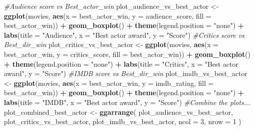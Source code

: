\documentclass[]{article}
\newenvironment{Shaded}{\begin{snugshade}}{\end{snugshade}}
\newcommand{\CommentTok}[1]{\textcolor[rgb]{0.56,0.35,0.01}{\textit{#1}}}
\newcommand{\DataTypeTok}[1]{\textcolor[rgb]{0.13,0.29,0.53}{#1}}
\newcommand{\DecValTok}[1]{\textcolor[rgb]{0.00,0.00,0.81}{#1}}
\newcommand{\KeywordTok}[1]{\textcolor[rgb]{0.13,0.29,0.53}{\textbf{#1}}}
\newcommand{\NormalTok}[1]{#1}
\newcommand{\OperatorTok}[1]{\textcolor[rgb]{0.81,0.36,0.00}{\textbf{#1}}}
\newcommand{\StringTok}[1]{\textcolor[rgb]{0.31,0.60,0.02}{#1}}
\begin{document}
\begin{Shaded}
\begin{Highlighting}[]
\CommentTok{#Audience score vs Best_actor_win}
\NormalTok{plot_audience_vs_best_actor <-}
\StringTok{  }\KeywordTok{ggplot}\NormalTok{(movies,}
         \KeywordTok{aes}\NormalTok{(}\DataTypeTok{x =}\NormalTok{ best_actor_win, }\DataTypeTok{y =}\NormalTok{ audience_score, }\DataTypeTok{fill =}\NormalTok{ best_actor_win)) }\OperatorTok{+}
\StringTok{  }\KeywordTok{geom_boxplot}\NormalTok{() }\OperatorTok{+}\StringTok{ }\KeywordTok{theme}\NormalTok{(}\DataTypeTok{legend.position =} \StringTok{"none"}\NormalTok{) }\OperatorTok{+}\StringTok{ }\KeywordTok{labs}\NormalTok{(}\DataTypeTok{title =} \StringTok{"Audience"}\NormalTok{, }\DataTypeTok{x =} \StringTok{"Best actor award"}\NormalTok{, }\DataTypeTok{y =} \StringTok{"Score"}\NormalTok{)}
\CommentTok{#Critics score vs Best_dir_win}
\NormalTok{plot_critics_vs_best_actor <-}
\StringTok{  }\KeywordTok{ggplot}\NormalTok{(movies,}
         \KeywordTok{aes}\NormalTok{(}\DataTypeTok{x =}\NormalTok{ best_actor_win, }\DataTypeTok{y =}\NormalTok{ critics_score, }\DataTypeTok{fill =}\NormalTok{ best_actor_win)) }\OperatorTok{+}\StringTok{ }\KeywordTok{geom_boxplot}\NormalTok{() }\OperatorTok{+}\StringTok{ }\KeywordTok{theme}\NormalTok{(}\DataTypeTok{legend.position =} \StringTok{"none"}\NormalTok{) }\OperatorTok{+}\StringTok{ }\KeywordTok{labs}\NormalTok{(}\DataTypeTok{title =} \StringTok{"Critics"}\NormalTok{, }\DataTypeTok{x =} \StringTok{"Best actor award"}\NormalTok{, }\DataTypeTok{y =} \StringTok{"Score"}\NormalTok{)}
\CommentTok{#IMDB score vs Best_dir_win}
\NormalTok{plot_imdb_vs_best_actor <-}
\StringTok{  }\KeywordTok{ggplot}\NormalTok{(movies,}
         \KeywordTok{aes}\NormalTok{(}\DataTypeTok{x =}\NormalTok{ best_actor_win, }\DataTypeTok{y =}\NormalTok{ imdb_rating, }\DataTypeTok{fill =}\NormalTok{ best_actor_win)) }\OperatorTok{+}\StringTok{ }\KeywordTok{geom_boxplot}\NormalTok{() }\OperatorTok{+}\StringTok{ }\KeywordTok{theme}\NormalTok{(}\DataTypeTok{legend.position =} \StringTok{"none"}\NormalTok{) }\OperatorTok{+}\StringTok{ }\KeywordTok{labs}\NormalTok{(}\DataTypeTok{title =} \StringTok{"IMDB"}\NormalTok{, }\DataTypeTok{x =} \StringTok{"Best actor award"}\NormalTok{, }\DataTypeTok{y =} \StringTok{"Score"}\NormalTok{)}
\CommentTok{#Combine the plots...}
\NormalTok{plot_combined_best_actor <-}
\StringTok{  }\KeywordTok{ggarrange}\NormalTok{(}
\NormalTok{    plot_audience_vs_best_actor,}
\NormalTok{    plot_critics_vs_best_actor,}
\NormalTok{    plot_imdb_vs_best_actor,}
    \DataTypeTok{ncol =} \DecValTok{3}\NormalTok{,}
    \DataTypeTok{nrow =} \DecValTok{1}
\NormalTok{  )}


\end{Highlighting}
\end{Shaded}
\end{document}
